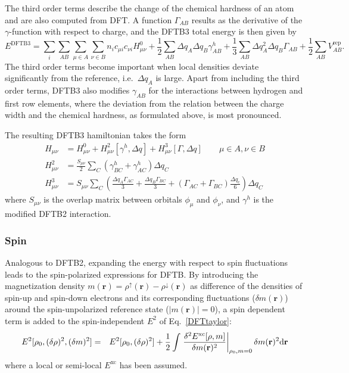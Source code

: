\documentclass[reprint,onecolumn,superscriptaddress]{revtex4-1}
\begin{document}
The third order terms describe the change of the chemical hardness of an atom
and are also computed from DFT. A function $\Gamma_{AB}$ results as the
derivative of the $\gamma$-function with respect to charge, and the DFTB3 total
energy is then given by
\begin{equation}
  E^{\text{DFTB3}} = \sum_i \sum_{AB}\sum_{\mu\in A}\sum_{\nu\in B} n_i c_{\mu i}
  c_{\nu i} H^0_{\mu\nu} + \frac{1}{2}\sum_{AB} \Delta q_A \Delta
  q_B\gamma_{AB}^h
  + \frac{1}{3}\sum_{AB} \Delta q_A^2 \Delta q_B\Gamma_{AB} +
  \frac{1}{2}\sum_{AB}V^{\text{rep}}_{AB}.
  \label{eq:etot}
\end{equation}
%
The third order terms become important when local densities deviate
significantly from the reference, i.e.\ $\Delta q_A$ is large. Apart from
including the third order terms, DFTB3 also modifies $\gamma_{AB}$ for the
interactions between hydrogen and first row elements,\cite{Elstner2007} where
the deviation from the relation between the charge width and the chemical
hardness, as formulated above, is most pronounced.

The resulting DFTB3 hamiltonian takes the form
\begin{align}
H_{\mu\nu} &= H^0_{\mu\nu} + H^2_{\mu\nu}[\gamma^h,\Delta q] + H^3_{\mu\nu}[\Gamma,\Delta q] \qquad{\mu \in A, \nu \in B} \label{dftb3Ham}\\
H^2_{\mu\nu} &= \frac{S_{\mu\nu}}{2} \sum\limits_C \left( \gamma^h_{BC} + \gamma^h_{AC} \right) \Delta q_C\\
H^3_{\mu\nu} &= S_{\mu\nu} \sum\limits_C \left( \frac{\Delta q_A \Gamma_{AC}}{3} + \frac{\Delta q_B
\Gamma_{BC}}{3} + \left( \Gamma_{AC} + \Gamma_{BC}
\right) \frac{\Delta q_c}{6} \right) \Delta q_C
\end{align}
where $S_{\mu\nu}$ is the overlap matrix between orbitals $\phi_\mu$ and
$\phi_\nu$, and $\gamma^h$ is the modified DFTB2 interaction.

\subsubsection{Spin}

Analogous to DFTB2, expanding the energy with respect to spin
fluctuations\cite{Frauenheim2000, Koehler2005, Koehler2001} leads to the
spin-polarized expressions for DFTB. By introducing the magnetization density
$m(\mathbf{r})=\rho^{\uparrow}(\mathbf{r})-\rho^{\downarrow}(\mathbf{r})$ as
difference of the densities of spin-up and spin-down electrons and its
corresponding fluctuations ($\delta m(\mathbf{r})$) around the spin-unpolarized
reference state ($|m(\mathbf{r})|=0$), a spin dependent term is added to the
spin-independent $E^2$ of Eq.~\eqref{DFTtaylor}:
\begin{eqnarray}
E^2[\rho_0,(\delta \rho)^2,(\delta m)^2]
  &=& E^2[\rho_0,(\delta \rho)^2] 
  +\frac{1}{2}\int 
  \eval{\frac{\delta^2E^{\text{xc}}[\rho,m]}{\delta m(\mathbf{r})^2}}_{\rho_0,m=0}\delta m(\mathbf{r})^2\mathrm{d}\mathbf{r} \label{spin1}
\end{eqnarray}
where a local or semi-local $E^{\text{xc}}$ has been assumed.
\end{document}
